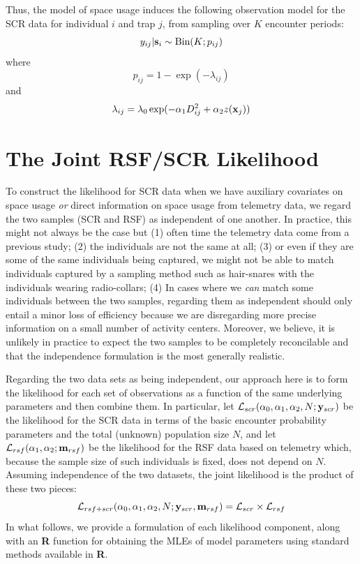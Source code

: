 Thus, the model of space usage induces the following 
observation model for the SCR data for individual $i$ and trap $j$,
from sampling over $K$ encounter periods:
\[
 y_{ij}|{\bf s}_{i} \sim \mbox{Bin}(K; p_{ij})
\]
where
\[
 p_{ij} = 1-\exp(- \lambda_{ij} )
\]
and
\[
 \lambda_{ij} = \lambda_{0} \exp(- \alpha_{1} D_{ij}^{2} + \alpha_{2} z({\bf x}_{j}) )
\]





\section{The Joint RSF/SCR Likelihood}

To construct the likelihood for SCR data when we have auxiliary
covariates on space usage {\it or} direct information on space usage
from telemetry data, we regard the two samples (SCR and RSF) as
independent of one another. In practice, this might not always be the
case but (1) often time the telemetry data come from a previous study;
(2) the individuals are not the same at all; (3) or even if they are
some of the same individuals being captured, we might not be able to
match individuals captured by a sampling method such as hair-snares
with the individuals wearing radio-collars; (4) In cases where we {\it
  can} match some individuals between the two samples, regarding them as
independent should only entail a minor
loss of efficiency
because we are disregarding more precise information on a small number
of activity centers. Moreover, we believe, it is unlikely in practice
to expect the two samples to be completely reconcilable and that the
independence formulation is the most generally realistic.

Regarding the two data sets as being independent, our approach here
is to form the likelihood for each set of observations as a function
of the same underlying parameters and then combine them. In
particular, let ${\cal L}_{scr}(\alpha_{0}, \alpha_{1}, \alpha_{2}, N;
{\bf y}_{scr})$
be the likelihood for the SCR data in terms of the basic encounter
probability parameters and the total (unknown) population size $N$,
and let ${\cal L}_{rsf}(\alpha_{1},\alpha_{2}; {\bf m}_{rsf})$ be the
likelihood for the RSF data based on telemetry which, because the
sample size of such individuals is fixed, does not depend on $N$.
Assuming independence of the two datasets, the
joint likelihood is the product of these two pieces:
\[
{\cal L}_{rsf+scr}(\alpha_{0},\alpha_{1},\alpha_{2},N; {\bf y}_{scr},{\bf
  m}_{rsf})  = {\cal L}_{scr} \times {\cal L}_{rsf}
\]
In what follows, we provide a formulation of each likelihood
component, along with an {\bf R} function for obtaining the MLEs of
model parameters using standard methods available in {\bf R}.





